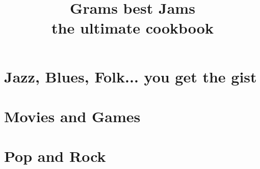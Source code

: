 \documentclass[openany]{book}
\title{Grams best Jams\\the ultimate cookbook}
\author{}
\date{}
\begin{document}
\maketitle
\frontmatter
\tableofcontents

\part{Jazz, Blues, Folk... you get the gist}







\part{Movies and Games}



\part{Pop and Rock}







\
\end{document}
